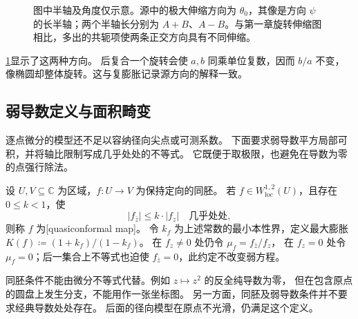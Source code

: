 \begin{figure}[htbp]
\centering
{}
\caption[实线性微分的椭圆与方向]{图中半轴及角度仅示意。源中的极大伸缩方向为 \(\theta_0\)，其像是方向 \(\psi\) 的长半轴；两个半轴长分别为 \(A+B\)、\(A-B\)。与第一章旋转伸缩图相比，多出的共轭项使两条正交方向具有不同伸缩。}
\label{b3:fig:B-differential-ellipse}
\end{figure}

\cref{b3:fig:B-differential-ellipse}显示了这两种方向。
后复合一个旋转会使 \(a,b\) 同乘单位复数，因而 \(b/a\) 不变，
像椭圆却整体旋转。这与复膨胀记录源方向的解释一致。

\subsection{弱导数定义与面积畸变}
\label{b3:subsec:B0102}

逐点微分的模型还不足以容纳径向尖点或可测系数。
下面要求弱导数平方局部可积，并将轴比限制写成几乎处处的不等式。
它既便于取极限，也避免在导数为零的点强行除法。

\begin{definition}[解析意义的拟共形映射]\label{b3:def:B-quasiconformal}
设 \(U,V\subseteq\mathbb C\) 为区域，\(f:U\rightarrow V\) 为保持定向的同胚。
若 \(f\in W^{1,2}_{\mathrm{loc}}(U)\)，且存在 \(0\le k<1\)，使
\[
 |f_{\bar z}|\le k\cdot|f_z|\quad\text{几乎处处},
\]
则称 \(f\) 为[quasiconformal map]。
令 \(k_f\) 为上述常数的最小本性界，定义最大膨胀
\(K(f)\coloneqq(1+k_f)/(1-k_f)\)。
在 \(f_z\ne0\) 处仍令 \(\mu_f=f_{\bar z}/f_z\)，
在 \(f_z=0\) 处令 \(\mu_f=0\)；后一集合上不等式也迫使
\(f_{\bar z}=0\)，此约定不改变弱方程。
\end{definition}
同胚条件不能由微分不等式代替。例如 \(z\mapsto z^2\) 的反全纯导数为零，
但在包含原点的圆盘上发生分支，不能用作一张坐标图。
另一方面，同胚及弱导数条件并不要求经典导数处处存在。
后面的径向模型在原点不光滑，仍满足这个定义。


